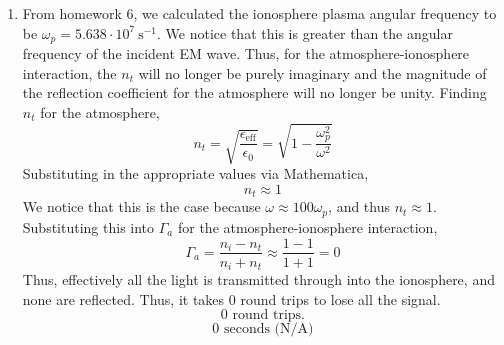 \documentclass[12pt]{article}
\begin{document}
\begin{enumerate}
\begin{enumerate}
		\item [(e)]
		From homework 6, we calculated the ionosphere plasma angular frequency to be $\omega_p=5.638 \cdot 10^7 \: \mathrm{s}^{-1}$.
		We notice that this is greater than the angular frequency of the incident EM wave.
		Thus, for the atmosphere-ionosphere interaction, the $n_t$ will no longer be purely imaginary and the magnitude of the reflection coefficient for the atmosphere will no longer be unity.
		Finding $n_t$ for the atmosphere,
		\[n_t = \sqrt{\frac{\epsilon_{\mathrm{eff}}}{\epsilon_0}}=\sqrt{1-\frac{\omega_p^2}{\omega^2}}\]
		Substituting in the appropriate values via Mathematica,
		\[n_t\approx 1\]
		We notice that this is the case because $\omega \approx 100\omega_p$, and thus $n_t\approx 1$.
		Substituting this into $\Gamma_a$ for the atmosphere-ionosphere interaction,
		\[\Gamma_a = \frac{n_i-n_t}{n_i+n_t}\approx\frac{1-1}{1+1}=0\]
		Thus, effectively all the light is transmitted through into the ionosphere, and none are reflected.
		Thus, it takes $0$ round trips to lose all the signal.
		\[\boxed{0\text{ round trips.}}\]
		\[\boxed{0\text{ seconds (N/A)}}\]



	\end{enumerate}
		
\end{enumerate}

		
\end{document}
